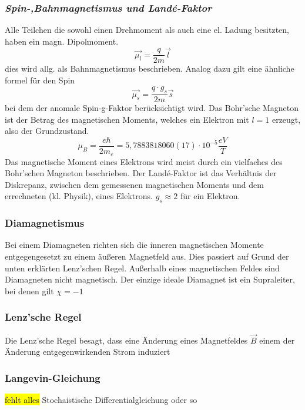         \subsubsection*{\textit{Spin-,Bahnmagnetismus und Landé-Faktor}}
            Alle Teilchen die sowohl einen Drehmoment als auch eine el. Ladung besitzten, haben ein magn. Dipolmoment.
            \begin{equation}
                \vec{\mu_l} = \frac{q}{2m} \vec{l}
            \end{equation}
            dies wird allg. als Bahnmagnetismus beschrieben. Analog dazu gilt eine ähnliche formel für den Spin
            \begin{equation}
                \vec{\mu_s} = \frac{q\cdot g_s}{2m} \vec{s}
            \end{equation}
            bei dem der anomale Spin-g-Faktor berücksichtigt wird.
            Das Bohr'sche Magneton ist der Betrag des magnetischen Moments, welches ein Elektron
            mit $l=1$ erzeugt, also der Grundzustand.
            \begin{equation}
                \mu_B = \frac{e \hbar}{2 m_e} = 5,7883818060(17)\cdot 10^{-5} \frac{eV}{T}
            \end{equation}
            Das magnetische Moment eines Elektrons wird meist durch ein vielfaches des Bohr'schen
            Magneton beschrieben.
            Der Landé-Faktor ist das Verhältnis der Diskrepanz, zwischen dem gemessenen magnetischen Moments
            und dem errechneten (kl. Physik), eines Elektrons. $g_s \approx 2$ für ein Elektron.
        \subsubsection*{Diamagnetismus}
            Bei einem Diamagneten richten sich die inneren magnetischen Momente entgegengesetzt
            zu einem äußeren Magnetfeld aus. Dies passiert auf Grund der unten erklärten Lenz'schen Regel.
            Außerhalb eines magnetischen Feldes sind Diamagneten
            nicht magnetisch. Der einzige ideale Diamagnet ist ein Supraleiter, bei denen gilt $\chi = -1$           
        \subsubsection*{Lenz'sche Regel}    
            Die Lenz'sche Regel besagt, dass eine Änderung eines Magnetfeldes $\vec{B}$ einem der Änderung
            entgegenwirkenden Strom induziert
        \subsubsection*{Langevin-Gleichung}
            \hl{fehlt alles}
            Stochaistische Differentialgleichung oder so 
